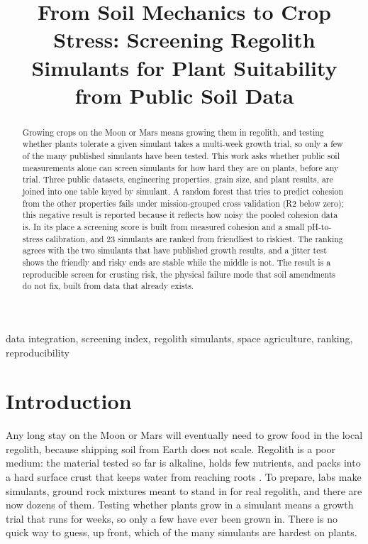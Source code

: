 \documentclass[conference,letterpaper,10pt]{IEEEtran}
\begin{document}
\title{From Soil Mechanics to Crop Stress: Screening Regolith Simulants for Plant Suitability from Public Soil Data}
\author{
}
\maketitle
\begin{abstract}
Growing crops on the Moon or Mars means growing them in regolith, and testing whether plants tolerate a given simulant takes a multi-week growth trial, so only a few of the many published simulants have been tested. This work asks whether public soil measurements alone can screen simulants for how hard they are on plants, before any trial. Three public datasets, engineering properties, grain size, and plant results, are joined into one table keyed by simulant. A random forest that tries to predict cohesion from the other properties fails under mission-grouped cross validation (R2 below zero); this negative result is reported because it reflects how noisy the pooled cohesion data is. In its place a screening score is built from measured cohesion and a small pH-to-stress calibration, and 23 simulants are ranked from friendliest to riskiest. The ranking agrees with the two simulants that have published growth results, and a jitter test shows the friendly and risky ends are stable while the middle is not. The result is a reproducible screen for crusting risk, the physical failure mode that soil amendments do not fix, built from data that already exists.
\end{abstract}
\begin{IEEEkeywords}
data integration, screening index, regolith simulants, space agriculture, ranking, reproducibility
\end{IEEEkeywords}
\section{Introduction}
Any long stay on the Moon or Mars will eventually need to grow food in the local regolith, because shipping soil from Earth does not scale. Regolith is a poor medium: the material tested so far is alkaline, holds few nutrients, and packs into a hard surface crust that keeps water from reaching roots \cite{russell}. To prepare, labs make simulants, ground rock mixtures meant to stand in for real regolith, and there are now dozens of them. Testing whether plants grow in a simulant means a growth trial that runs for weeks, so only a few have ever been grown in. There is no quick way to guess, up front, which of the many simulants are hardest on plants.
\end{document}
